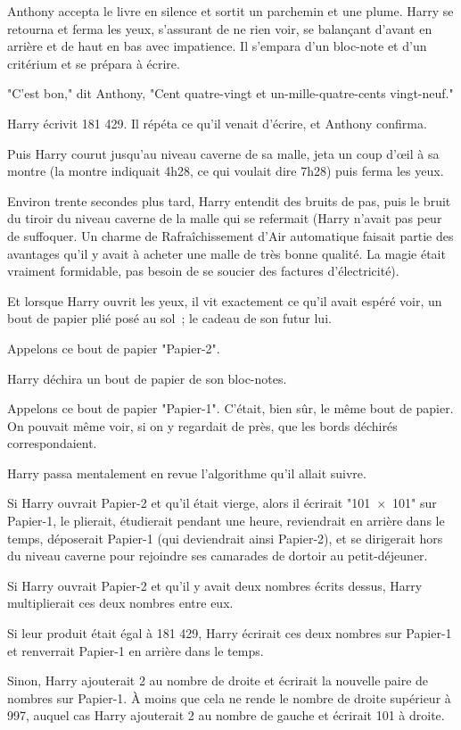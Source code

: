Anthony accepta le livre en silence et sortit un parchemin et une plume. Harry se retourna et ferma les yeux, s'assurant de ne rien voir, se balançant d'avant en arrière et de haut en bas avec impatience. Il s'empara d'un bloc-note et d'un critérium et se prépara à écrire.

"C'est bon," dit Anthony, "Cent quatre-vingt et un-mille-quatre-cents vingt-neuf."

Harry écrivit 181 429. Il répéta ce qu'il venait d'écrire, et Anthony confirma.

Puis Harry courut jusqu'au niveau caverne de sa malle, jeta un coup d'œil à sa montre (la montre indiquait 4h28, ce qui voulait dire 7h28) puis ferma les yeux.

Environ trente secondes plus tard, Harry entendit des bruits de pas, puis le bruit du tiroir du niveau caverne de la malle qui se refermait (Harry n'avait pas peur de suffoquer. Un charme de Rafraîchissement d'Air automatique faisait partie des avantages qu'il y avait à acheter une malle de très bonne qualité. La magie était vraiment formidable, pas besoin de se soucier des factures d'électricité).

Et lorsque Harry ouvrit les yeux, il vit exactement ce qu'il avait espéré voir, un bout de papier plié posé au sol~; le cadeau de son futur lui.

Appelons ce bout de papier "Papier-2".

Harry déchira un bout de papier de son bloc-notes.

Appelons ce bout de papier "Papier-1". C'était, bien sûr, le même bout de papier. On pouvait même voir, si on y regardait de près, que les bords déchirés correspondaient.

Harry passa mentalement en revue l'algorithme qu'il allait suivre.

Si Harry ouvrait Papier-2 et qu'il était vierge, alors il écrirait "101~$\times$~101" sur Papier-1, le plierait, étudierait pendant une heure, reviendrait en arrière dans le temps, déposerait Papier-1 (qui deviendrait ainsi Papier-2), et se dirigerait hors du niveau caverne pour rejoindre ses camarades de dortoir au petit-déjeuner.

Si Harry ouvrait Papier-2 et qu'il y avait deux nombres écrits dessus, Harry multiplierait ces deux nombres entre eux.

Si leur produit était égal à 181 429, Harry écrirait ces deux nombres sur Papier-1 et renverrait Papier-1 en arrière dans le temps.

Sinon, Harry ajouterait 2 au nombre de droite et écrirait la nouvelle paire de nombres sur Papier-1. À moins que cela ne rende le nombre de droite supérieur à 997, auquel cas Harry ajouterait 2 au nombre de gauche et écrirait 101 à droite.


